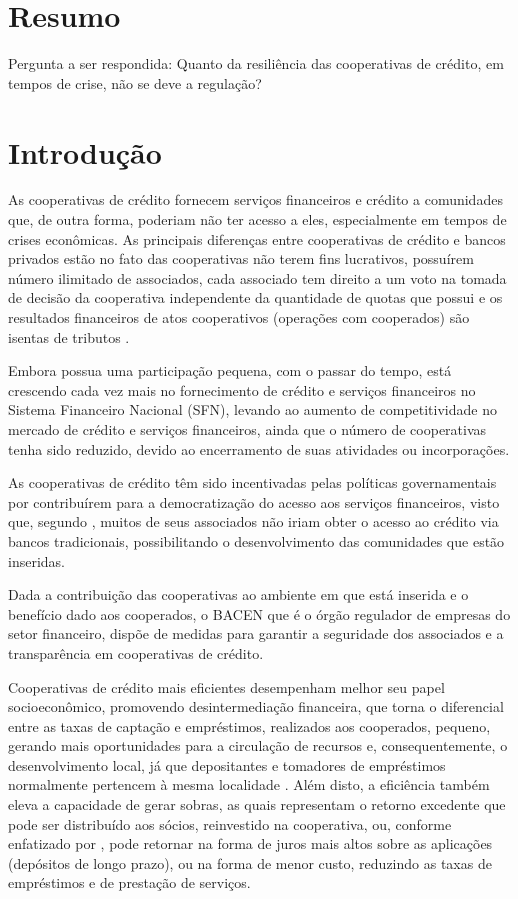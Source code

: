 \documentclass[ppgcc]{fearp}
\begin{document}
\section{Resumo}
Pergunta a ser respondida: Quanto da resiliência das cooperativas de crédito, em tempos de crise, não se deve a regulação?

\section{Introdução}

As cooperativas de crédito fornecem serviços financeiros e crédito a comunidades que, de outra forma, poderiam não ter acesso a eles, especialmente em tempos de crises econômicas.  As principais diferenças entre cooperativas de crédito e bancos privados estão no fato das cooperativas não terem fins lucrativos, possuírem número ilimitado de associados, cada associado tem direito a um voto na tomada de decisão da cooperativa independente da quantidade de quotas que possui e os resultados financeiros de atos cooperativos (operações com cooperados) são isentas de tributos \cite{santos2009}.

Embora possua uma participação pequena, com o passar do tempo, está crescendo cada vez mais no fornecimento de crédito e serviços financeiros no Sistema Financeiro Nacional (SFN), levando ao aumento de competitividade no mercado de crédito e serviços financeiros, ainda que o número de cooperativas tenha sido reduzido, devido ao encerramento de suas atividades ou incorporações.

As cooperativas de crédito têm sido incentivadas pelas políticas governamentais por contribuírem para a democratização do acesso aos serviços financeiros, visto que, segundo , muitos de seus associados não iriam obter o acesso ao crédito via bancos tradicionais, possibilitando o desenvolvimento das comunidades que estão inseridas. 

Dada a contribuição das cooperativas ao ambiente em que está inserida e o benefício dado aos cooperados, o BACEN que é o órgão regulador de empresas do setor financeiro, dispõe de medidas para garantir a seguridade dos associados e a transparência em cooperativas de crédito.

Cooperativas de crédito mais eficientes desempenham melhor seu papel socioeconômico, promovendo desintermediação financeira, que torna o diferencial entre as taxas de captação e empréstimos, realizados aos cooperados, pequeno, gerando mais oportunidades para a circulação de recursos e, consequentemente, o desenvolvimento local, já que depositantes e tomadores de empréstimos normalmente pertencem à mesma localidade \cite{ferreiragoncalvesbraga2007}. Além disto, a eficiência também eleva a capacidade de gerar sobras, as quais representam o retorno excedente que pode ser distribuído aos sócios, reinvestido na cooperativa, ou, conforme enfatizado por , pode retornar na forma de juros mais altos sobre as aplicações (depósitos de longo prazo), ou na forma de menor custo, reduzindo as taxas de empréstimos e de prestação de serviços. 
\end{document}
